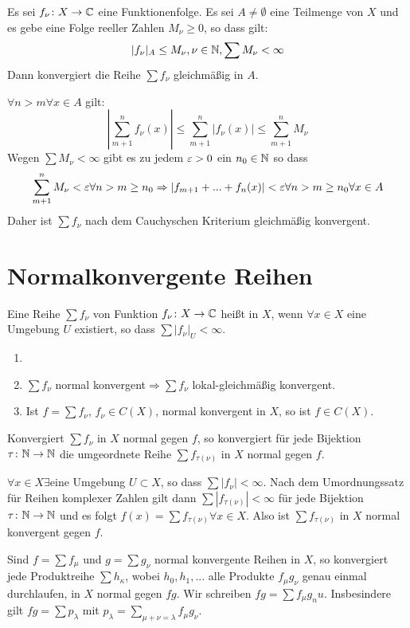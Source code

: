 \begin{satz}
	Es sei $ f_\nu\colon X\rightarrow\mathbb{C} $ eine Funktionenfolge. Es sei $ A\neq\emptyset $ eine Teilmenge von $ X $ und es gebe eine Folge reeller Zahlen $ M_\nu\geq 0 $, so dass gilt:
	\[ |f_\nu|_A\leq M_\nu,\nu\in\mathbb{N},\sum M_\nu<\infty \]
	Dann konvergiert die Reihe $ \sum f_\nu $ gleichm\"a\ss ig in $ A $.
\end{satz}
\begin{beweis}
	$ \forall n>m\forall x\in A $ gilt:
	\[ \left|\sum_{m+1}^n f_\nu(x)\right|\leq\sum_{m+1}^{n}|f_\nu(x)|\leq\sum_{m+1}^{n}M_\nu \]
	Wegen $ \sum M_\nu<\infty $ gibt es zu jedem $ \varepsilon>0 $ ein $ n_0\in\mathbb{N} $ so dass
	\[ \sum_{m+1}^n M_\nu<\varepsilon\forall n>m\geq n_0\Rightarrow |f_{m+1}+...+f_n(x)|<\varepsilon\forall n>m\geq n_0\forall x\in A \]
	Daher ist $ \sum f_\nu $ nach dem Cauchyschen Kriterium gleichm\"a\ss ig konvergent.
\end{beweis}
\section{Normalkonvergente Reihen}
\begin{definition}
	Eine Reihe $ \sum f_\nu $ von Funktion $ f_\nu\colon X\rightarrow\mathbb{C} $ hei\ss t  in $ X $, wenn $ \forall x\in X $ eine Umgebung $ U $ existiert, so dass $ \sum |f_\nu|_U<\infty $.
\end{definition}
\begin{bemerkung*}
	\begin{enumerate}
		\item[]
		\item $ \sum f_\nu $ normal konvergent$ \Rightarrow\sum f_\nu $ lokal-gleichm\"a\ss ig konvergent.
		\item Ist $ f=\sum f_\nu $, $ f_\nu\in C(X) $, normal konvergent in $ X $, so ist $ f\in C(X) $.
	\end{enumerate}
\end{bemerkung*}
\begin{satz}[Umordnungssatz]
	Konvergiert $ \sum f_\nu $ in $ X $ normal gegen $ f $, so konvergiert f\"ur jede Bijektion $ \tau\colon\mathbb{N}\rightarrow\mathbb{N} $ die umgeordnete Reihe $ \sum f_{\tau(\nu)} $ in $ X $ normal gegen $ f $.
\end{satz}
\begin{beweis}
	$ \forall x\in X\exists $eine Umgebung $ U\subset X $, so dass $ \sum |f_\nu|<\infty $. Nach dem Umordnungssatz f\"ur Reihen komplexer Zahlen gilt dann $ \sum |f_{\tau(\nu)}|<\infty $ f\"ur jede Bijektion $ \tau\colon\mathbb{N}\rightarrow\mathbb{N} $ und es folgt $ f(x)=\sum f_{\tau(\nu)}\forall x\in X $. Also ist $ \sum f_{\tau(\nu)} $ in $ X $ normal konvergent gegen $ f $.
\end{beweis}
\begin{satz}
	Sind $ f=\sum f_\mu $ und $ g=\sum g_\nu $ normal konvergente Reihen in $ X $, so konvergiert jede Produktreihe $ \sum h_\kappa $, wobei $ h_0,h_1,... $ alle Produkte $ f_\mu g_\nu $ genau einmal durchlaufen, in $ X $ normal gegen $ fg $. Wir schreiben $ fg=\sum f_\mu g_nu $. Insbesindere gilt $ fg=\sum p_\lambda $ mit $ p_\lambda=\sum_{\mu+\nu=\lambda}^{}f_\mu g_\nu $.
\end{satz}